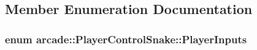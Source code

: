 \subsection{Member Enumeration Documentation}
\hypertarget{classarcade_1_1_player_control_snake_a96f388c5ab92cf0eb8efb6654d73cf05}{
\subsubsection[{Player\-Inputs}]{\setlength{\rightskip}{0pt plus 5cm}enum {\bf arcade\-::\-Player\-Control\-Snake\-::\-Player\-Inputs}}}\label{classarcade_1_1_player_control_snake_a96f388c5ab92cf0eb8efb6654d73cf05}
